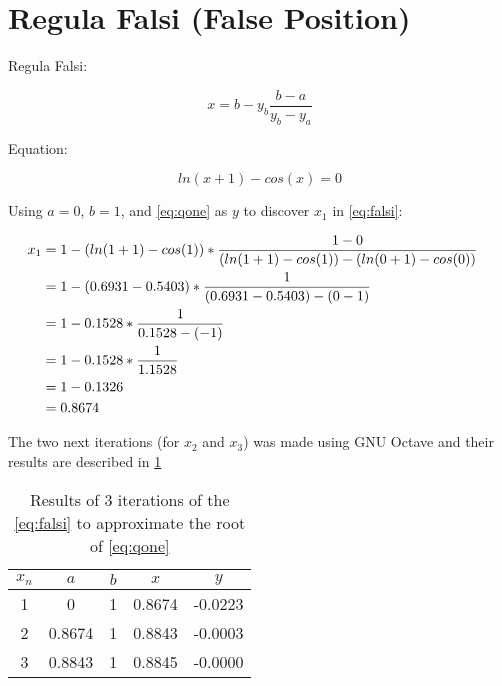 \section{Regula Falsi (False Position)}
	
	Regula Falsi:
	
	\begin{equation}
		x = b - y_{b}\frac{b-a}{y_{b}-y_{a}}
	\label{eq:falsi}
	\end{equation}
	
	Equation:
	
	\begin{equation}
		ln(x+1) - cos(x) = 0
	\label{eq:qone}
	\end{equation}
	
	Using $a = 0$, $b = 1$, and \cref{eq:qone} as $y$ to discover $x_{1}$ in \cref{eq:falsi}:
	
	\begin{align}
		x_{1} &= 1 - \left( ln(1+1) - cos(1) \right)*\frac{1-0}{\left( ln(1+1) - cos(1) \right) - \left( ln(0+1) - cos(0) \right)}& \notag \\
		&= 1 - \left( 0.6931 - 0.5403 \right)*\frac{1}{\left( 0.6931 - 0.5403 \right) - \left( 0 - 1 \right)}& \notag \\
		&= 1 - 0.1528*\frac{1}{0.1528 - (-1)}& \notag \\
		&= 1 - 0.1528 *\frac{1}{1.1528}& \notag \\
		&= 1 - 0.1326& \notag \\
		&= 0.8674&
		\label{eq:qonexone}
	\end{align}

	The two next iterations (for $x_{2}$ and $x_{3}$) was made using GNU Octave and their results are described in \cref{tab:qone}

	\begin{table}[H]
		\begin{center}
			\begin{tabular}{|c||c|c||c|c|}
				\hline
				\textbf{$x_{n}$} & \textbf{$a$} & \textbf{$b$} & \textbf{$x$} & \textbf{$y$} \\ \hline
				1 & 0 & 1 & 0.8674 & -0.0223 \\ \hline
				2 & 0.8674 & 1 & 0.8843 & -0.0003 \\ \hline
				3 & 0.8843 & 1 & 0.8845 & -0.0000 \\ \hline
			\end{tabular}
			\caption{Results of 3 iterations of the \cref{eq:falsi} to approximate the root of \cref{eq:qone}}
			\label{tab:qone}
		\end{center}
	\end{table}